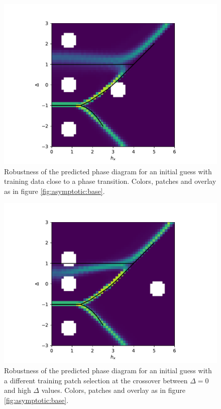 \documentclass[prl, reprint, twocolumn]{revtex4-1}
\begin{document}
	\begin{figure}[h]
		\includegraphics[width=\columnwidth]{3_6_Weak4PhaseDetection2DEdges_330_20190119}
		
		\caption{Robustness of the predicted phase diagram for an initial guess with training data close to a phase transition. Colors, patches and overlay as in figure \ref{fig:asymptotic:base}.}
		\label{fig:asymptotic:transition}
	\end{figure}

	\begin{figure}[h]
	\includegraphics[width=\columnwidth]{3_6_Weak4PhaseDetection2DEdges_34_20190119}
	
	\caption{Robustness of the predicted phase diagram for an initial guess with a different training patch selection at the crossover between $\Delta=0$ and high $\Delta$ values. Colors, patches and overlay as in figure \ref{fig:asymptotic:base}.}
	\label{fig:asymptotic:crossover}
	\end{figure}
\end{document}
